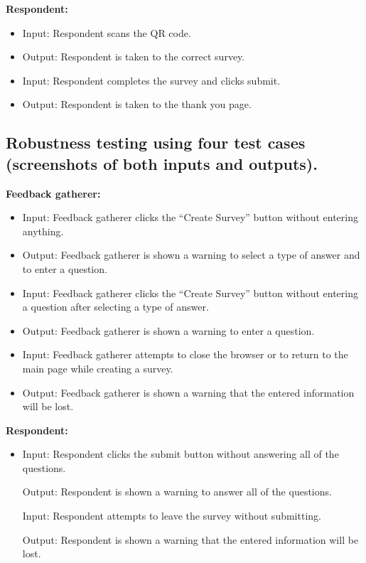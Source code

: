 \documentclass[letterpaper, 12 pt, conference]{ieeeconf}
\begin{document}
\hfill \break
\textbf{Respondent:}
\begin{itemize}
    \item[] Input: Respondent scans the QR code.
    \item[] Output: Respondent is taken to the correct survey.
    \item[] Input: Respondent completes the survey and clicks submit.
    \item[] Output: Respondent is taken to the thank you page.
\end{itemize}

\hfill \break
\newpage

\subsection{Robustness testing using four test cases (screenshots of both inputs and outputs).}
\newline
\hfill

\textbf{Feedback gatherer:}

\begin{itemize}
    \item[] Input: Feedback gatherer clicks the “Create Survey” button without entering anything.
\item[] Output: Feedback gatherer is shown a warning to select a type of answer and to enter a question.
\item[] Input: Feedback gatherer clicks the “Create Survey” button without entering a question after selecting a type of answer.
\item[] Output: Feedback gatherer is shown a warning to enter a question.
\item[] Input: Feedback gatherer attempts to close the browser or to return to the main page while creating a survey.
\item[] Output: Feedback gatherer is shown a warning that the entered information will be lost.
\end{itemize}
\newline 
\hfill \break

\textbf{Respondent:}
\begin{itemize}
    \item[] Input: Respondent clicks the submit button without answering all of the questions.

Output: Respondent is shown a warning to answer all of the questions.

Input: Respondent attempts to leave the survey without submitting.

Output: Respondent is shown a warning that the entered information will be lost.

\end{itemize}
\newpage 
\end{document}
